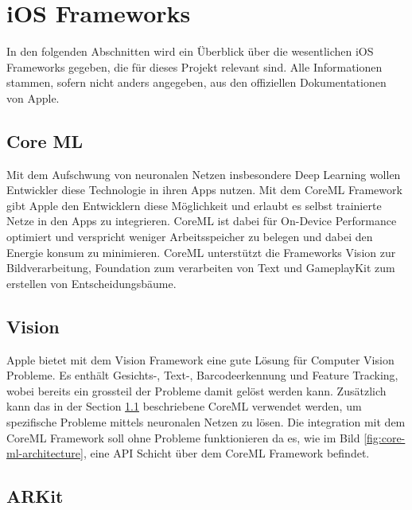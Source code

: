 \section{iOS Frameworks}
In den folgenden Abschnitten wird ein Überblick über die wesentlichen iOS Frameworks gegeben, die für dieses Projekt relevant sind. Alle Informationen stammen, sofern nicht anders angegeben, aus den offiziellen Dokumentationen von Apple. %


\subsection{Core ML} \label{subsub:core-ml}
Mit dem Aufschwung von neuronalen Netzen insbesondere Deep Learning wollen Entwickler diese Technologie in ihren Apps nutzen. Mit dem CoreML Framework gibt Apple den Entwicklern diese Möglichkeit und erlaubt es selbst trainierte Netze in den Apps zu integrieren. CoreML \cite{core-ml} ist dabei für On-Device Performance optimiert und verspricht weniger Arbeitsspeicher zu belegen und dabei den Energie konsum zu minimieren. CoreML unterstützt die Frameworks Vision zur Bildverarbeitung, Foundation zum verarbeiten von Text und GameplayKit zum erstellen von Entscheidungsbäume.


\subsection{Vision}
Apple bietet mit dem Vision \cite{vision} Framework eine gute Lösung für Computer Vision Probleme. Es enthält Gesichts-, Text-, Barcodeerkennung und Feature Tracking, wobei bereits ein grossteil der Probleme damit gelöst werden kann. Zusätzlich kann das in der Section \ref{subsub:core-ml} beschriebene CoreML verwendet werden, um spezifische Probleme mittels neuronalen Netzen zu lösen. Die integration mit dem CoreML Framework soll ohne Probleme funktionieren da es, wie im Bild \ref{fig:core-ml-architecture}, eine API Schicht über dem CoreML Framework befindet.

\subsection{ARKit}

